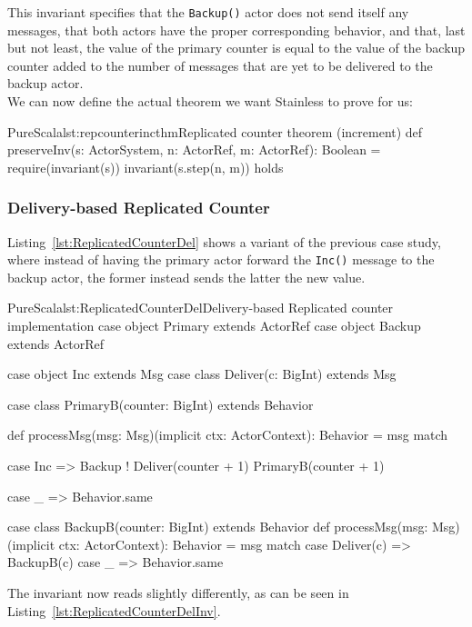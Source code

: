 \documentclass[a4paper,twoside]{article}
\newcommand{\RefCode}[1]{Listing~\ref{#1}}
\newcommand{\stt}[1]{\texttt{\small{#1}}}
\begin{document}
This invariant specifies that the \stt{Backup()} actor does not send itself any messages, that both actors have the proper corresponding behavior, and that, last but not least, the value of the primary counter is equal to the value of the backup counter added to the number of messages that are yet to be delivered to the backup actor.\\

We can now define the actual theorem we want Stainless to prove for us:

\begin{Code}{PureScala}{lst:repcounterincthm}{Replicated counter theorem (increment)}
def preserveInv(s: ActorSystem, n: ActorRef, m: ActorRef): Boolean = {
  require(invariant(s))
  invariant(s.step(n, m))
} holds
\end{Code}

\subsubsection{Delivery-based Replicated Counter}

\RefCode{lst:ReplicatedCounterDel} shows a variant of the previous case study, where instead of having the primary actor forward the \stt{Inc()} message to the backup actor, the former instead sends the latter the new value.

\begin{Code}{PureScala}{lst:ReplicatedCounterDel}{Delivery-based Replicated counter implementation}
case object Primary extends ActorRef
case object Backup  extends ActorRef

case object Inc extends Msg
case class Deliver(c: BigInt) extends Msg

case class PrimaryB(counter: BigInt) extends Behavior {
  def processMsg(msg: Msg)(implicit ctx: ActorContext): Behavior = msg match {
    case Inc =>
      Backup ! Deliver(counter + 1)
      PrimaryB(counter + 1)

    case _ => Behavior.same
  }
}

case class BackupB(counter: BigInt) extends Behavior {
  def processMsg(msg: Msg)(implicit ctx: ActorContext): Behavior = msg match {
    case Deliver(c) => BackupB(c)
    case _          => Behavior.same
  }
}
\end{Code}

The invariant now reads slightly differently, as can be seen in \RefCode{lst:ReplicatedCounterDelInv}.
\end{document}
